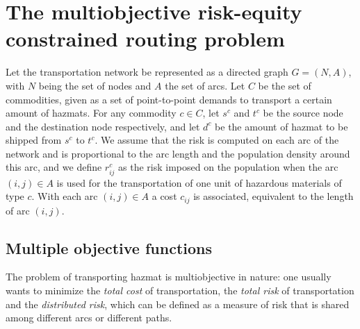 \documentclass[preprint,12pt]{elsarticle}
\begin{document}




\section{The multiobjective risk-equity constrained routing problem}
\label{S_RECRP}

Let the transportation network be represented as a directed graph $G = (N, A)$, with $N$ being the set of nodes and $A$ the set of arcs. Let $C$ be the set of commodities, given as a set of point-to-point demands to transport a certain amount of hazmats. For any commodity $c\in C$, let $s^c$ and $t^c$ be the source node and the destination node respectively, and let $d^c$ be the amount of hazmat to be shipped from $s^c$ to $t^c$. We assume that the risk is computed on each arc of the network and is proportional to the arc length and the population density around this arc, and we define $r_{ij}^c$ as the risk imposed on the population when the arc $(i, j) \in A$ is used for the transportation of one unit of hazardous materials of type $c$. With each arc $(i,j) \in A$ a cost $c_{ij}$ is associated, equivalent to the length of arc $(i,j)$.

\subsection{Multiple objective functions}
\label{SS_MOF}


The problem of transporting hazmat is multiobjective in nature: one usually wants to minimize the \textit{total cost} of transportation, the \textit{total risk} of transportation and the {\em distributed risk}, which can be defined as a measure of risk that is shared among different arcs or different paths. 
\end{document}
